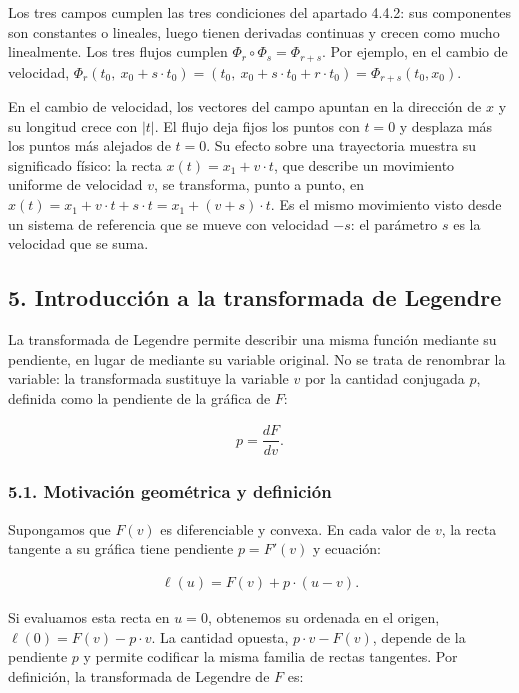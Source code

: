 \documentclass[
  spanish,
]{article}
\begin{document}
Los tres campos cumplen las tres condiciones del apartado 4.4.2: sus
componentes son constantes o lineales, luego tienen derivadas continuas
y crecen como mucho linealmente. Los tres flujos cumplen
\(\Phi_r \circ \Phi_s = \Phi_{r+s}\). Por ejemplo, en el cambio de
velocidad,
\(\Phi_r(t_0,\ x_0 + s \cdot t_0) = (t_0,\ x_0 + s \cdot t_0 + r \cdot t_0) = \Phi_{r+s}(t_0, x_0)\).

En el cambio de velocidad, los vectores del campo apuntan en la
dirección de \(x\) y su longitud crece con \(|t|\). El flujo deja fijos
los puntos con \(t = 0\) y desplaza más los puntos más alejados de
\(t = 0\). Su efecto sobre una trayectoria muestra su significado
físico: la recta \(x(t) = x_1 + v \cdot t\), que describe un movimiento
uniforme de velocidad \(v\), se transforma, punto a punto, en
\(x(t) = x_1 + v \cdot t + s \cdot t = x_1 + (v + s) \cdot t\). Es el
mismo movimiento visto desde un sistema de referencia que se mueve con
velocidad \(-s\): el parámetro \(s\) es la velocidad que se suma.

\subsection{5. Introducción a la transformada de
Legendre}\label{introducciuxf3n-a-la-transformada-de-legendre}

La transformada de Legendre permite describir una misma función mediante
su pendiente, en lugar de mediante su variable original. No se trata de
renombrar la variable: la transformada sustituye la variable \(v\) por
la cantidad conjugada \(p\), definida como la pendiente de la gráfica de
\(F\):

\[
\begin{aligned}
p = \dfrac{dF}{dv}.
\end{aligned}
\]

\subsubsection{5.1. Motivación geométrica y
definición}\label{motivaciuxf3n-geomuxe9trica-y-definiciuxf3n}

Supongamos que \(F(v)\) es diferenciable y convexa. En cada valor de
\(v\), la recta tangente a su gráfica tiene pendiente \(p=F'(v)\) y
ecuación:

\[
\begin{aligned}
\ell(u) = F(v) + p \cdot (u-v).
\end{aligned}
\]

Si evaluamos esta recta en \(u=0\), obtenemos su ordenada en el origen,
\(\ell(0)=F(v)-p \cdot v\). La cantidad opuesta, \(p \cdot v-F(v)\),
depende de la pendiente \(p\) y permite codificar la misma familia de
rectas tangentes. Por definición, la transformada de Legendre de \(F\)
es:
\end{document}

